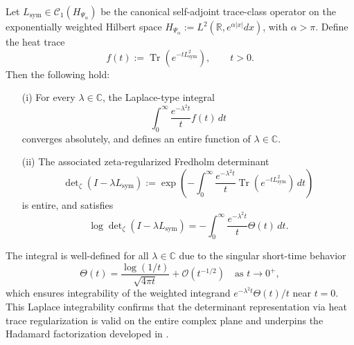 \begin{lemma}
\label{lem:laplace_integrability_heat_trace}
Let \( L_{\mathrm{sym}} \in \mathcal{C}_1(H_{\Psi_\alpha}) \) be the canonical self-adjoint trace-class operator on the exponentially weighted Hilbert space \( H_{\Psi_\alpha} := L^2(\mathbb{R}, e^{\alpha|x|} dx) \), with \( \alpha > \pi \). Define the heat trace
\[
f(t) := \operatorname{Tr}\left(e^{-t L_{\mathrm{sym}}^2}\right), \qquad t > 0.
\]
Then the following hold:
\begin{enumerate}
    \item[\textnormal{(i)}] For every \( \lambda \in \mathbb{C} \), the Laplace-type integral
    \[
    \int_0^\infty \frac{e^{-\lambda^2 t}}{t} f(t)\, dt
    \]
    converges absolutely, and defines an entire function of \( \lambda \in \mathbb{C} \).
    
    \item[\textnormal{(ii)}] The associated zeta-regularized Fredholm determinant
    \[
    \det\nolimits_{\zeta}(I - \lambda L_{\mathrm{sym}}) := \exp\left( -\int_0^\infty \frac{e^{-\lambda^2 t}}{t} \operatorname{Tr}\left(e^{-t L_{\mathrm{sym}}^2}\right) \, dt \right)
    \]
    is entire, and satisfies
    \[
    \log \det\nolimits_{\zeta}(I - \lambda L_{\mathrm{sym}}) = - \int_0^\infty \frac{e^{-\lambda^2 t}}{t} \Theta(t)\, dt.
    \]
\end{enumerate}

\medskip
\noindent
The integral is well-defined for all \( \lambda \in \mathbb{C} \) due to the singular short-time behavior
\[
\Theta(t) = \frac{\log(1/t)}{\sqrt{4\pi t}} + \mathcal{O}(t^{-1/2}) \quad \text{as } t \to 0^+,
\]
which ensures integrability of the weighted integrand \( e^{-\lambda^2 t} \Theta(t)/t \) near \( t = 0 \). This Laplace integrability confirms that the determinant representation via heat trace regularization is valid on the entire complex plane and underpins the Hadamard factorization developed in .
\end{lemma}
